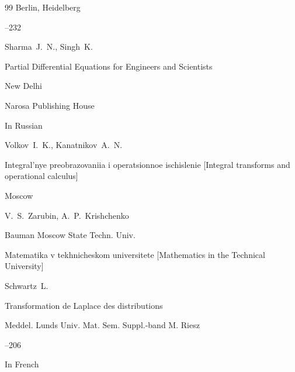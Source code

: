 \begin{thebibliography}{99}
\publaddr Berlin, Heidelberg


--232





\by Sharma~J.~N., Singh~K.

\book Partial Differential Equations for Engineers and Scientists

\publaddr New Delhi

\publ Narosa Publishing House







\lang In Russian

\by Volkov~I.~K., Kanatnikov~A.~N.

\book Integral'nye preobrazovaniia i operatsionnoe ischislenie \rm [Integral transforms and operational calculus]

\publaddr Moscow

\eds V.~S.~Zarubin, A.~P.~Krishchenko 

\publ Bauman Moscow State Techn. Univ.



\serial Matematika v tekhnicheskom universitete \rm [Mathe\-matics in the Technical University]








\by Schwartz~L.

\paper Transformation de Laplace des distributions

\jour Meddel. Lunds Univ. Mat. Sem. Suppl.-band M. Riesz


--206 

\lang In French








\end{thebibliography}

